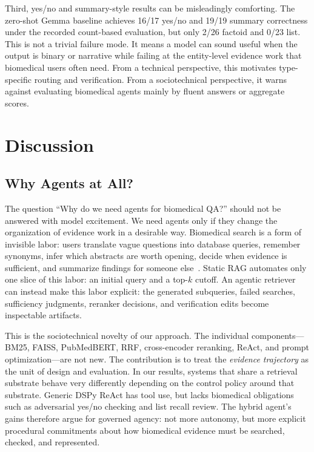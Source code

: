 \documentclass[sigconf,nonacm]{acmart}
\begin{document}
Third, yes/no and summary-style results can be misleadingly comforting. The zero-shot Gemma baseline achieves 16/17 yes/no and 19/19 summary correctness under the recorded count-based evaluation, but only 2/26 factoid and 0/23 list. This is not a trivial failure mode. It means a model can sound useful when the output is binary or narrative while failing at the entity-level evidence work that biomedical users often need. From a technical perspective, this motivates type-specific routing and verification. From a sociotechnical perspective, it warns against evaluating biomedical agents mainly by fluent answers or aggregate scores.

\section{Discussion}

\subsection{Why Agents at All?}

The question ``Why do we need agents for biomedical QA?'' should not be answered with model excitement. We need agents only if they change the organization of evidence work in a desirable way. Biomedical search is a form of invisible labor: users translate vague questions into database queries, remember synonyms, infer which abstracts are worth opening, decide when evidence is sufficient, and summarize findings for someone else~\cite{suchman1995}. Static RAG automates only one slice of this labor: an initial query and a top-$k$ cutoff. An agentic retriever can instead make this labor explicit: the generated subqueries, failed searches, sufficiency judgments, reranker decisions, and verification edits become inspectable artifacts.

This is the sociotechnical novelty of our approach. The individual components---BM25, FAISS, PubMedBERT, RRF, cross-encoder reranking, ReAct, and prompt optimization---are not new. The contribution is to treat the \emph{evidence trajectory} as the unit of design and evaluation. In our results, systems that share a retrieval substrate behave very differently depending on the control policy around that substrate. Generic DSPy ReAct has tool use, but lacks biomedical obligations such as adversarial yes/no checking and list recall review. The hybrid agent's gains therefore argue for governed agency: not more autonomy, but more explicit procedural commitments about how biomedical evidence must be searched, checked, and represented.
\end{document}
